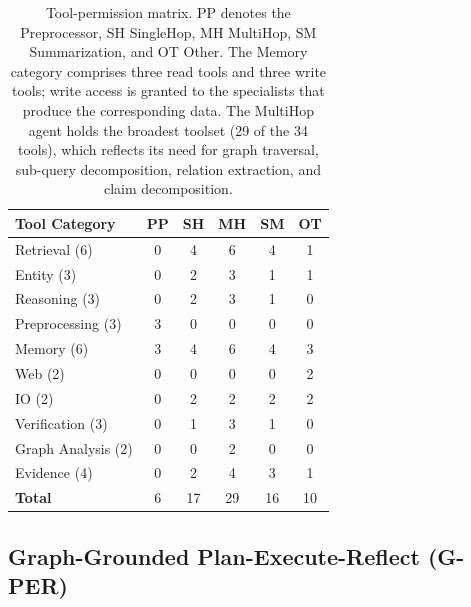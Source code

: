 \documentclass[11pt,a4paper]{article}
\begin{document}
\begin{table}[t]
\centering
\small
\begin{tabular}{@{}lccccc@{}}
\toprule
\textbf{Tool Category} & \textbf{PP} & \textbf{SH} & \textbf{MH} & \textbf{SM} & \textbf{OT} \\
\midrule
Retrieval (6)           & 0 & 4 & 6 & 4 & 1 \\
Entity (3)              & 0 & 2 & 3 & 1 & 1 \\
Reasoning (3)           & 0 & 2 & 3 & 1 & 0 \\
Preprocessing (3)       & 3 & 0 & 0 & 0 & 0 \\
Memory (6)              & 3 & 4 & 6 & 4 & 3 \\
Web (2)                 & 0 & 0 & 0 & 0 & 2 \\
IO (2)                  & 0 & 2 & 2 & 2 & 2 \\
Verification (3)        & 0 & 1 & 3 & 1 & 0 \\
Graph Analysis (2)      & 0 & 0 & 2 & 0 & 0 \\
Evidence (4)            & 0 & 2 & 4 & 3 & 1 \\
\midrule
\textbf{Total}          & 6 & 17 & 29 & 16 & 10 \\
\bottomrule
\end{tabular}
\caption{Tool-permission matrix. PP denotes the Preprocessor, SH SingleHop, MH MultiHop, SM Summarization, and OT Other. The Memory category comprises three read tools and three write tools; write access is granted to the specialists that produce the corresponding data. The MultiHop agent holds the broadest toolset (29 of the 34 tools), which reflects its need for graph traversal, sub-query decomposition, relation extraction, and claim decomposition.}
\label{tab:tool_matrix}
\end{table}

\subsection{Graph-Grounded Plan-Execute-Reflect (G-PER)}
\label{sec:per}
\end{document}
